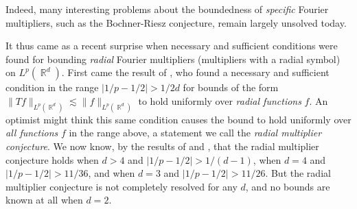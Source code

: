 \documentclass[12pt]{article}
\DeclareMathOperator{\ZZ}{\mathbb{Z}}
\DeclareMathOperator{\RR}{\mathbb{R}}
\DeclareMathOperator{\NN}{\mathbb{N}}
\begin{document}


 Indeed, many interesting problems about the boundedness of \emph{specific} Fourier multipliers, such as the Bochner-Riesz conjecture, remain largely unsolved today.

It thus came as a recent surprise when necessary and sufficient conditions were found for bounding \emph{radial} Fourier multipliers (multipliers with a radial symbol) on $L^p(\RR^d)$. First came the result of \cite{GarrigosSeeger}, who found a necessary and sufficient condition in the range $|1/p - 1/2| > 1/2d$ for bounds of the form $\| Tf \|_{L^p(\RR^d)} \lesssim \| f \|_{L^p(\RR^d)}$ to hold uniformly over \emph{radial functions} $f$.
An optimist might think this same condition causes the bound to hold uniformly over \emph{all functions} $f$ in the range above, a statement we call the \emph{radial multiplier conjecture}. We now know, by the results of \cite{HeoNazarovSeeger} and \cite{Cladek}, that the radial multiplier conjecture holds when $d > 4$ and $|1/p - 1/2| > 1/(d-1)$, when $d = 4$ and $|1/p - 1/2| > 11/36$, and when $d = 3$ and $|1/p - 1/2| > 11/26$. But the radial multiplier conjecture is not completely resolved for any $d$, and no bounds are known at all when $d = 2$.
\end{document}
